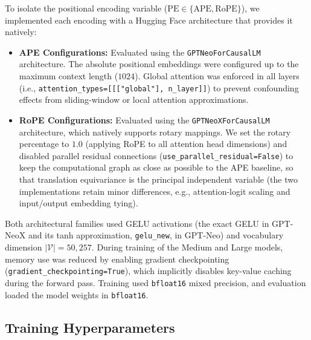 To isolate the positional encoding variable ($\mathrm{PE} \in \{\text{APE}, \text{RoPE}\}$), we implemented each encoding with a Hugging Face architecture that provides it natively:
\begin{itemize}
    \item \textbf{APE Configurations:} Evaluated using the \texttt{GPTNeoForCausalLM} architecture. The absolute positional embeddings were configured up to the maximum context length ($1024$). Global attention was enforced in all layers (i.e., \texttt{attention\_types=[[["global"], n\_layer]]}) to prevent confounding effects from sliding-window or local attention approximations.
    \item \textbf{RoPE Configurations:} Evaluated using the \texttt{GPTNeoXForCausalLM} architecture, which natively supports rotary mappings. We set the rotary percentage to $1.0$ (applying RoPE to all attention head dimensions) and disabled parallel residual connections (\texttt{use\_parallel\_residual=False}) to keep the computational graph as close as possible to the APE baseline, so that translation equivariance is the principal independent variable (the two implementations retain minor differences, e.g., attention-logit scaling and input/output embedding tying). %

\end{itemize}
Both architectural families used GELU activations (the exact GELU in GPT-NeoX and its tanh approximation, \texttt{gelu\_new}, in GPT-Neo) and vocabulary dimension $|\mathcal{V}| = 50{,}257$. During training of the Medium and Large models, memory use was reduced by enabling gradient checkpointing (\texttt{gradient\_checkpointing=True}), %
 which implicitly disables key-value caching during the forward pass. Training used \texttt{bfloat16} mixed precision, and evaluation loaded the model weights in \texttt{bfloat16}.

\subsection{Training Hyperparameters}

